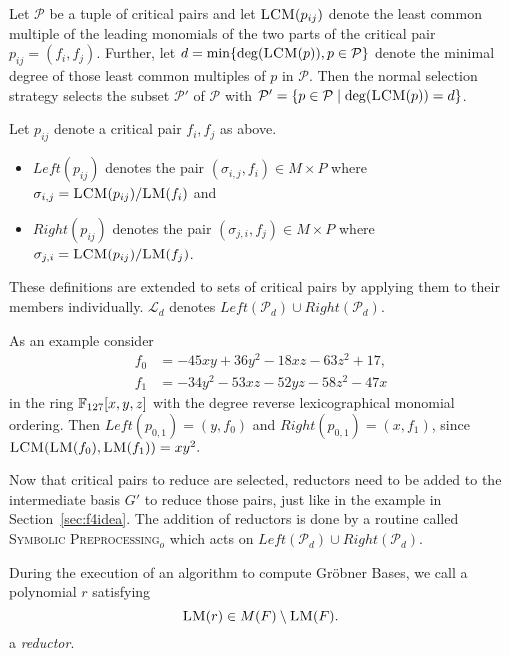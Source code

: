 \begin{definition}
Let $\mathcal{P}$ be a tuple of critical pairs and let $\textsc{LCM}(p_{ij})$ denote the least common multiple of the leading monomials of the two parts of the critical pair $p_{ij} = (f_i,f_j)$. Further, let $d = \min\{\deg(\textsc{LCM}(p)), p \in \mathcal{P}\}$ denote the minimal degree of those least common multiples of $p$ in $\mathcal{P}$. Then the normal selection strategy selects the subset $\mathcal{P}'$ of $\mathcal{P}$ with $\mathcal{P}' = \{ p \in \mathcal{P} \mid \deg(\textsc{LCM}(p))=d\}$.
\end{definition}

\begin{definition}
Let $p_{ij}$ denote a critical pair $f_i,f_j$ as above. 
\begin{itemize}
 \item  $Left(p_{ij})$ denotes the pair  $(\sigma_{i,j},f_i) \in M \times P$ where $\sigma_{i,j} = \textsc{LCM}(p_{ij})/\textsc{LM}(f_i)$ and
 \item $Right(p_{ij})$ denotes the pair  $(\sigma_{j,i},f_j) \in M \times P$ where $\sigma_{j,i} = \textsc{LCM}(p_{ij})/\textsc{LM}(f_j)$. 
\end{itemize}
These definitions are extended to sets of critical pairs by applying them to their members individually. $\mathcal{L}_d$ denotes $Left(\mathcal{P}_d) \cup Right(\mathcal{P}_d)$.
\end{definition}

\begin{example}
As an example consider
\begin{align*}
f_0 & = -45xy  + 36y^2 - 18xz - 63z^2 + 17,\\
f_1 & = -34y^2 - 53xz  - 52yz - 58z^2 - 47x
\end{align*}
in the ring $\mathbb{F}_{127}[x,y,z]$ with the degree reverse lexicographical monomial ordering. Then $Left(p_{0,1}) = (y,f_0)$ and $Right(p_{0,1}) = (x,f_1)$,
since $\textsc{LCM}(\textsc{LM}(f_0),\textsc{LM}(f_1)) = xy^2.$
\end{example}

Now that critical pairs to reduce are selected, reductors need to be added to the intermediate basis $G'$ to reduce those pairs, just like in the example in
Section~\ref{sec:f4idea}. The addition of reductors is done by a routine called \textsc{Symbolic Preprocessing$_o$} which acts on $Left(\mathcal{P}_d) \cup
Right(\mathcal{P}_d)$.

\begin{definition}[Reductor]
During the execution of an algorithm to compute Gröbner Bases, we call a polynomial $r$ satisfying
\[ \textsc{LM}(r) \in M(F) \setminus \textsc{LM}(F). \] a \emph{reductor}.
\end{definition}

